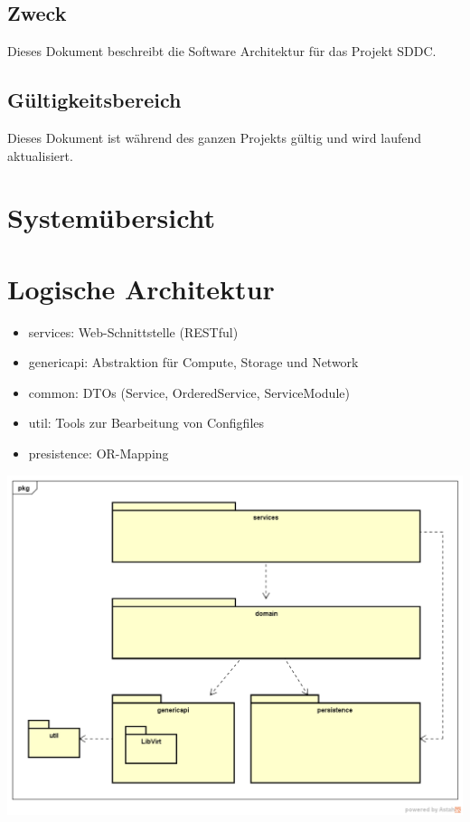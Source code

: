 \documentclass[11pt]{scrartcl}
\begin{document}
\subsection{Zweck}
Dieses Dokument beschreibt die Software Architektur für das Projekt SDDC.
\subsection{Gültigkeitsbereich}
Dieses Dokument ist während des ganzen Projekts gültig und wird laufend aktualisiert.

\newpage

\section{Systemübersicht}

\section{Logische Architektur}
\begin{itemize}
	\item services: Web-Schnittstelle (RESTful)
	\item genericapi: Abstraktion für Compute, Storage und Network
	\item common: DTOs (Service, OrderedService, ServiceModule)
	\item util: Tools zur Bearbeitung von Configfiles
	\item presistence: OR-Mapping
\end{itemize}

\begin{center}
\includegraphics[scale=0.5]{LogischeSicht}
\end{center}
\end{document}
